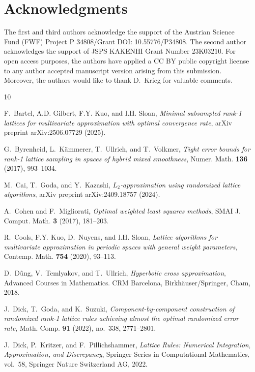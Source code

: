 \documentclass[a4paper,11pt]{article}
\begin{document}
\section*{Acknowledgments}

The first and third authors acknowledge the support of the Austrian Science Fund (FWF) Project  P 34808/Grant DOI: 10.55776/P34808. The second author acknowledges the support of JSPS KAKENHI Grant Number 23K03210. For open access purposes, the authors have applied a CC BY public copyright license to any author accepted manuscript version arising from this submission. Moreover, the authors would like to thank D.~Krieg for valuable comments.



\begin{thebibliography}{10}

F.~Bartel, A.D. Gilbert, F.Y. Kuo, and I.H. Sloan, \emph{Minimal subsampled rank-1 lattices for multivariate approximation with optimal convergence rate}, arXiv preprint arXiv:2506.07729 (2025).

G.~Byrenheid, L.~Kämmerer, T.~Ullrich, and T.~Volkmer, \emph{Tight error bounds for rank-1 lattice sampling in spaces of hybrid mixed smoothness}, Numer. Math. \textbf{136} (2017), 993–1034.

M.~Cai, T.~Goda, and Y.~Kazashi, \emph{{$L_2$}-approximation using randomized lattice algorithms}, arXiv preprint arXiv:2409.18757 (2024).

A.~Cohen and F.~Migliorati, \emph{{Optimal weighted least squares methods}}, SMAI J. Comput. Math. \textbf{3} (2017), 181--203.

R.~Cools, F.Y. Kuo, D.~Nuyens, and I.H. Sloan, \emph{Lattice algorithms for multivariate approximation in periodic spaces with general weight parameters}, Contemp. Math. \textbf{754} (2020), 93--113.

D.~D\~ung, V.~Temlyakov, and T.~Ullrich, \emph{Hyperbolic cross approximation}, Advanced Courses in Mathematics. CRM Barcelona, Birkh\"auser/Springer, Cham, 2018.

J.~Dick, T.~Goda, and K.~Suzuki, \emph{Component-by-component construction of randomized rank-1 lattice rules achieving almost the optimal randomized error rate}, Math. Comp. \textbf{91} (2022), no.~338, 2771--2801.

J.~Dick, P.~Kritzer, and F.~Pillichshammer, \emph{{Lattice Rules: Numerical Integration, Approximation, and Discrepancy}}, Springer Series in Computational Mathematics, vol.~58, Springer Nature Switzerland AG, 2022.


\end{thebibliography}
\end{document}
